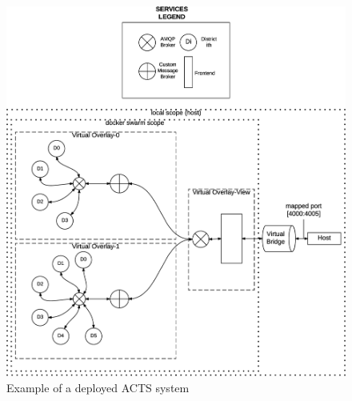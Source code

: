 \begin{figure}[H]
\centering
\includegraphics[scale=0.3,keepaspectratio]{images/user-man/eps/deploy.eps}
\caption{Example of a deployed ACTS system}
\label{fig:deploy-sys}
\end{figure}
